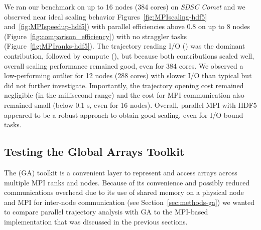 We ran our benchmark on up to 16 nodes (384 cores) on \emph{SDSC Comet} and we observed near ideal scaling behavior Figures~\ref{fig:MPIscaling-hdf5} and~\ref{fig:MPIspeedup-hdf5}) with parallel efficiencies above 0.8 on up to 8 nodes (Figure~\ref{fig:comparison_efficiency}) with no straggler tasks (Figure~\ref{fig:MPIranks-hdf5}).
The trajectory reading I/O (\tIO) was the dominant contribution, followed by compute (\tcomp), but because both contributions scaled well, overall scaling performance remained good, even for 384 cores.
We observed a low-performing outlier for 12 nodes (288 cores) with slower I/O than typical but did not further investigate.
Importantly, the trajectory opening cost remained negligible (in the millisecond range) and the cost for MPI communication also remained small (below 0.1 s, even for 16 nodes).
Overall, parallel MPI with HDF5 appeared to be a robust approach to obtain good scaling, even for I/O-bound tasks.


\subsection{Testing the Global Arrays Toolkit}
\label{Global-Array}

The  (GA) toolkit \cite{GA} is a convenient layer to represent and access arrays across multiple MPI ranks and nodes.
Because of its convenience and possibly reduced communications overhead due to its use of shared memory on a physical node and MPI for inter-node communication (see Section~\ref{sec:methods-ga}) we wanted to compare parallel trajectory analysis with GA to the MPI-based implementation that was discussed in the previous sections.


